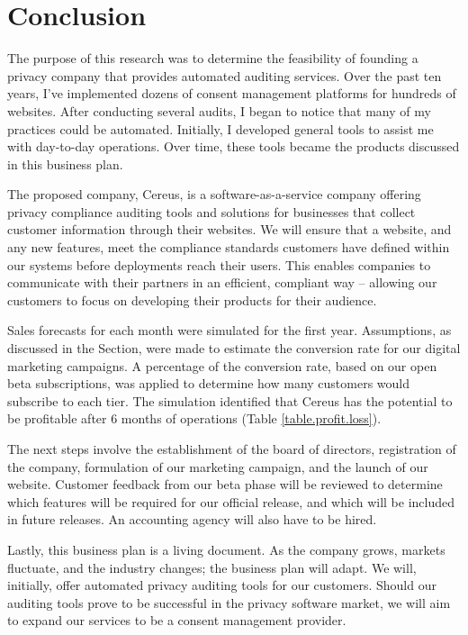 {\let\cleardoublepage\relax \chapter*{Conclusion}}

The purpose of this research was to determine the feasibility of founding a privacy company that provides automated auditing services. Over the past ten years, I’ve implemented dozens of consent management platforms for hundreds of websites. After conducting several audits, I began to notice that many of my practices could be automated. Initially, I developed general tools to assist me with day-to-day operations. Over time, these tools became the products discussed in this business plan.

The proposed company, Cereus, is a software-as-a-service company offering privacy compliance auditing tools and solutions for businesses that collect customer information through their websites. We will ensure that a website, and any new features, meet the compliance standards customers have defined within our systems before deployments reach their users. This enables companies to communicate with their partners in an efficient, compliant way – allowing our customers to focus on developing their products for their audience.

Sales forecasts for each month were simulated for the first year. Assumptions, as discussed in the  Section, were made to estimate the conversion rate for our digital marketing campaigns. A percentage of the conversion rate, based on our open beta subscriptions, was applied to determine how many customers would subscribe to each tier. The simulation identified that Cereus has the potential to be profitable after 6 months of operations (Table \ref{table.profit.loss}).

The next steps involve the establishment of the board of directors, registration of the company, formulation of our marketing campaign, and the launch of our website. Customer feedback from our beta phase will be reviewed to determine which features will be required for our official release, and which will be included in future releases. An accounting agency will also have to be hired.

Lastly, this business plan is a living document. As the company grows, markets fluctuate, and the industry changes; the business plan will adapt. We will, initially, offer automated privacy auditing tools for our customers. Should our auditing tools prove to be successful in the privacy software market, we will aim to expand our services to be a consent management provider.